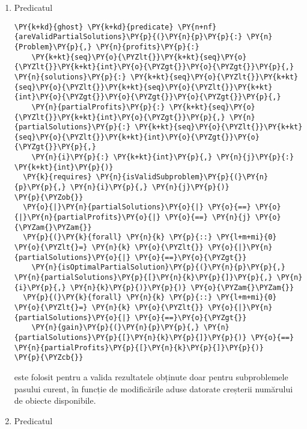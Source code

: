 \begin{sloppypar}
\begin{enumerate}
\begin{Verbatim}[commandchars=\\\{\}]
\PY{p}{\PYZcb{}}
\end{Verbatim}
    este folosit pentru a defini o subproblemă a problemei inițiale.
    \item Predicatul 
    \begin{Verbatim}[commandchars=\\\{\}]
\PY{k+kd}{ghost} \PY{k+kd}{predicate} \PY{n+nf}{areValidPartialSolutions}\PY{p}{(}\PY{n}{p}\PY{p}{:} \PY{n}{Problem}\PY{p}{,} \PY{n}{profits}\PY{p}{:} 
    \PY{k+kt}{seq}\PY{o}{\PYZlt{}}\PY{k+kt}{seq}\PY{o}{\PYZlt{}}\PY{k+kt}{int}\PY{o}{\PYZgt{}}\PY{o}{\PYZgt{}}\PY{p}{,} \PY{n}{solutions}\PY{p}{:} \PY{k+kt}{seq}\PY{o}{\PYZlt{}}\PY{k+kt}{seq}\PY{o}{\PYZlt{}}\PY{k+kt}{seq}\PY{o}{\PYZlt{}}\PY{k+kt}{int}\PY{o}{\PYZgt{}}\PY{o}{\PYZgt{}}\PY{o}{\PYZgt{}}\PY{p}{,} 
    \PY{n}{partialProfits}\PY{p}{:} \PY{k+kt}{seq}\PY{o}{\PYZlt{}}\PY{k+kt}{int}\PY{o}{\PYZgt{}}\PY{p}{,} \PY{n}{partialSolutions}\PY{p}{:} \PY{k+kt}{seq}\PY{o}{\PYZlt{}}\PY{k+kt}{seq}\PY{o}{\PYZlt{}}\PY{k+kt}{int}\PY{o}{\PYZgt{}}\PY{o}{\PYZgt{}}\PY{p}{,} 
    \PY{n}{i}\PY{p}{:} \PY{k+kt}{int}\PY{p}{,} \PY{n}{j}\PY{p}{:} \PY{k+kt}{int}\PY{p}{)}    
  \PY{k}{requires} \PY{n}{isValidSubproblem}\PY{p}{(}\PY{n}{p}\PY{p}{,} \PY{n}{i}\PY{p}{,} \PY{n}{j}\PY{p}{)}
\PY{p}{\PYZob{}}
  \PY{o}{|}\PY{n}{partialSolutions}\PY{o}{|} \PY{o}{==} \PY{o}{|}\PY{n}{partialProfits}\PY{o}{|} \PY{o}{==} \PY{n}{j} \PY{o}{\PYZam{}\PYZam{}} 
  \PY{p}{(}\PY{k}{forall} \PY{n}{k} \PY{p}{::} \PY{l+m+mi}{0} \PY{o}{\PYZlt{}=} \PY{n}{k} \PY{o}{\PYZlt{}} \PY{o}{|}\PY{n}{partialSolutions}\PY{o}{|} \PY{o}{==}\PY{o}{\PYZgt{}} 
    \PY{n}{isOptimalPartialSolution}\PY{p}{(}\PY{n}{p}\PY{p}{,} \PY{n}{partialSolutions}\PY{p}{[}\PY{n}{k}\PY{p}{]}\PY{p}{,} \PY{n}{i}\PY{p}{,} \PY{n}{k}\PY{p}{)}\PY{p}{)} \PY{o}{\PYZam{}\PYZam{}} 
  \PY{p}{(}\PY{k}{forall} \PY{n}{k} \PY{p}{::} \PY{l+m+mi}{0} \PY{o}{\PYZlt{}=} \PY{n}{k} \PY{o}{\PYZlt{}} \PY{o}{|}\PY{n}{partialSolutions}\PY{o}{|} \PY{o}{==}\PY{o}{\PYZgt{}} 
    \PY{n}{gain}\PY{p}{(}\PY{n}{p}\PY{p}{,} \PY{n}{partialSolutions}\PY{p}{[}\PY{n}{k}\PY{p}{]}\PY{p}{)} \PY{o}{==} \PY{n}{partialProfits}\PY{p}{[}\PY{n}{k}\PY{p}{]}\PY{p}{)}
\PY{p}{\PYZcb{}}
\end{Verbatim}
    este folosit pentru a valida rezultatele obținute doar pentru subproblemele pasului curent, în funcție de modificările aduse datorate creșterii numărului de obiecte disponibile.
    \item Predicatul 
    \begin{Verbatim}[commandchars=\\\{\}]

\end{Verbatim}
\end{enumerate}
\end{sloppypar}
